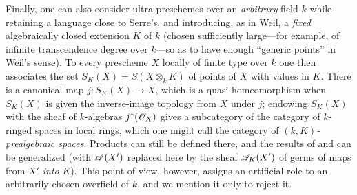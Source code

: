 \begin{env}[10.10.5]
\label{IV.10.10.5}
Finally, one can also consider ultra-preschemes over an \emph{arbitrary} field $k$ while
retaining a language close to Serre's, and introducing, as in Weil, a \emph{fixed}
algebraically closed extension $K$ of $k$ (chosen sufficiently large---for example,
of infinite transcendence degree over $k$---so as to have enough ``generic points''
in Weil's sense).
To every prescheme $X$ locally of finite type over $k$ one then associates the set $S_K(X)=S(X\otimes_k K)$
of points of $X$ with values in $K$.
There is a canonical map $j:S_K(X)\to X$, which is a quasi-homeomorphism when
$S_K(X)$ is given the inverse-image topology from $X$ under $j$; endowing $S_K(X)$
with the sheaf of $k$-algebras $j^*(\mathscr{O}_X)$ gives a subcategory of the category
of $k$-ringed spaces in local rings, which one might call the category of
\emph{$(k,K)$-prealgebraic spaces}.
Products can still be defined there, and the results of  and
 can be generalized (with $\mathscr{A}(X')$ replaced here by the sheaf
$\mathscr{A}_K(X')$ of germs of maps from $X'$ \emph{into} $K$).
This point of view, however, assigns an artificial role to an arbitrarily chosen
overfield of $k$, and we mention it only to reject it.
\end{env}
